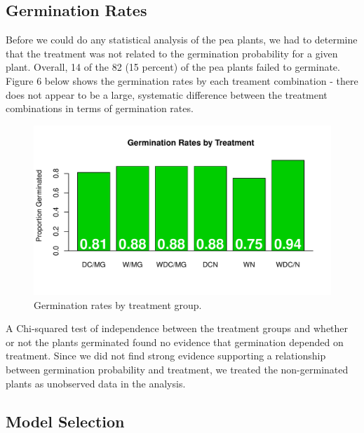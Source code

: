 \documentclass[1p,12pt]{elsarticle}\usepackage[]{graphicx}\usepackage[]{color}
\makeatletter
\def\maxwidth{ %
  \ifdim\Gin@nat@width>\linewidth
    \linewidth
  \else
    \Gin@nat@width
  \fi
}
\newenvironment{knitrout}{}{} %
\makeatother
\begin{document}
\subsection{Germination Rates}
Before we could do any statistical analysis of the pea plants, we had to determine that the treatment was not related to the germination probability for a given plant. Overall, 14 of the 82 (15 percent) of the pea plants failed to germinate. Figure 6 below shows the germination rates by each treament combination - there does not appear to be a large, systematic difference between the treatment combinations in terms of germination rates. 

\begin{knitrout}
\color{fgcolor}\begin{figure}
\includegraphics[width=\maxwidth]{figure/germination_rates-1} \caption[Germination rates by treatment group]{Germination rates by treatment group.}\label{fig:germination_rates}
\end{figure}


\end{knitrout}

A Chi-squared test of independence between the treatment groups and whether or not the plants germinated found no evidence that germination depended on treatment.  Since we did not find strong evidence supporting a relationship between germination probability and treatment, we treated the non-germinated plants as unobserved data in the analysis. 



\subsection{Model Selection}
\end{document}
